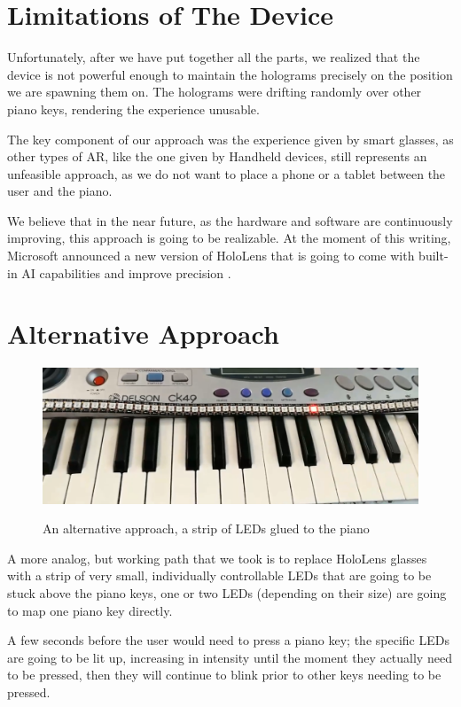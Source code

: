 \documentclass[12 pct]{report}
\begin{document}
\section{Limitations of The Device}

Unfortunately, after we have put together all the parts, we realized that the device is not powerful enough to maintain the holograms precisely on the position we are spawning them on. 
The holograms were drifting randomly over other piano keys, rendering the experience unusable.

The key component of our approach was the experience given by smart glasses, as other types of AR, like the one given by Handheld devices, still represents an unfeasible approach, as we do not want to place a phone or a tablet between the user and the piano.

We believe that in the near future, as the hardware and software are continuously improving, this approach is going to be realizable. 
At the moment of this writing, Microsoft announced a new version of HoloLens that is going to come with built-in AI capabilities and improve precision \cite{hololens2}.

\section{Alternative Approach}

\begin{figure}[H]
\includegraphics[width=1.0\textwidth]{piano-leds}
\centering
\label{fig:feature-points}
\caption{An alternative approach, a strip of LEDs glued to the piano}
\end{figure}

A more analog, but working path that we took is to replace HoloLens glasses with a strip of very small, individually controllable LEDs that are going to be stuck above the piano keys, one or two LEDs (depending on their size) are going to map one piano key directly. 

A few seconds before the user would need to press a piano key; the specific LEDs are going to be lit up, increasing in intensity until the moment they actually need to be pressed, then they will continue to blink prior to other keys needing to be pressed.
\end{document}
